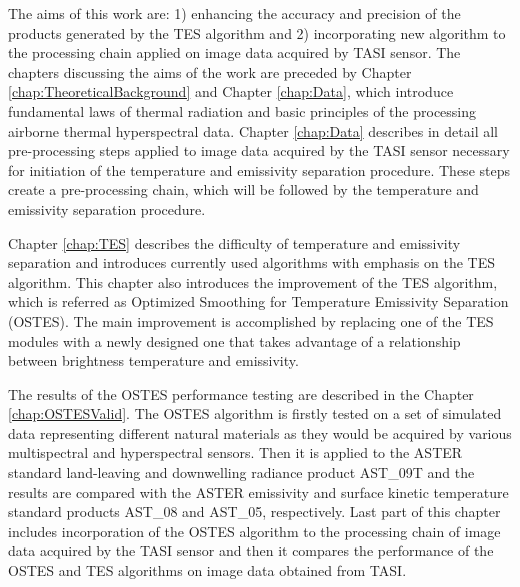 The aims of this work are: 1) enhancing the accuracy and precision of the products generated by the TES algorithm and 2) incorporating new algorithm to the processing chain applied on image data acquired by TASI sensor. The chapters discussing the aims of the work are preceded by Chapter \ref{chap:TheoreticalBackground} and Chapter \ref{chap:Data}, which introduce fundamental laws of thermal radiation and basic principles of the processing airborne thermal hyperspectral data. Chapter \ref{chap:Data} describes in detail all pre-processing steps applied to image data acquired by the TASI sensor necessary for initiation of the temperature and emissivity separation procedure. These steps create a pre-processing chain, which will be followed by the temperature and emissivity separation procedure.

Chapter \ref{chap:TES} describes the difficulty of temperature and emissivity separation and introduces currently used algorithms with emphasis on the TES algorithm. This chapter also introduces the improvement of the TES algorithm, which is referred as Optimized Smoothing for Temperature Emissivity Separation (OSTES). The main improvement is accomplished by replacing one of the TES modules with a newly designed one that takes advantage of a relationship between brightness temperature and emissivity.

The results of the OSTES performance testing are described in the Chapter \ref{chap:OSTESValid}. The OSTES algorithm is firstly tested on a set of simulated data representing different natural materials as they would be acquired by various multispectral and hyperspectral sensors. Then it is applied to the ASTER standard land-leaving and downwelling radiance product AST\_09T and the results are compared with the ASTER emissivity and surface kinetic temperature standard products AST\_08 and AST\_05, respectively. Last part of this chapter includes incorporation of the OSTES algorithm to the processing chain of image data acquired by the TASI sensor and then it compares the performance of the OSTES and TES algorithms on image data obtained from TASI.

